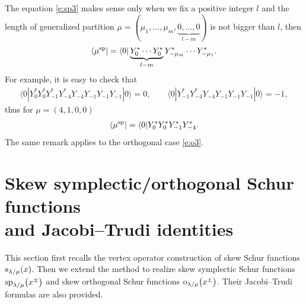 \documentclass[pdftex]{sigma}
\numberwithin{equation}{section}
\begin{document}
\begin{Remark}
The equation \eqref{e:sp3} makes sense only when we fix a positive integer $l$ and the length of generalized partition $\mu=(\mu_1, \dots,\mu_m,\underbrace{0,\dots,0}_{l-m})$ is not bigger than $l$, then
\begin{align*}
\langle \mu^{\rm sp}|=\langle 0|\underbrace{Y^*_0\cdots Y^*_0}_{l-m}Y^*_{-\mu_m}\cdots Y^*_{-\mu_1}.
\end{align*}
For example, it is easy to check that
\begin{align*}
\langle 0|Y^*_0 Y^*_0Y^*_{-1}Y^*_{-4}Y_{-4}Y_{-1}Y_{-1}Y_{-1}|0\rangle=0,\qquad\langle 0|Y^*_{-1}Y^*_{-4}Y_{-4}Y_{-1}Y_{-1}Y_{-1}|0\rangle=-1,
\end{align*}
thus for $\mu=(4, 1, 0, 0)$
\begin{align*}
\langle \mu^{\rm sp}|=\langle 0|Y^*_0 Y^*_0Y^*_{-1}Y^*_{-4}.
\end{align*}
The same remark applies to the orthogonal case \eqref{e:o3}.
\end{Remark}

\section[Skew symplectic/orthogonal Schur functions and Jacobi--Trudi identities]{Skew symplectic/orthogonal Schur functions\\ and Jacobi--Trudi identities}\label{s3}

This section first recalls the vertex operator construction of skew Schur functions ${\rm s}_{\lambda/\mu}(x)$.
Then we extend the method to realize skew symplectic Schur functions ${\rm sp}_{\lambda/\mu}\big(x^{\pm}\big)$ and skew orthogonal Schur functions ${\rm o}_{\lambda/\mu}\big(x^{\pm}\big)$. Their
Jacobi--Trudi formulas are also provided.
\end{document}
